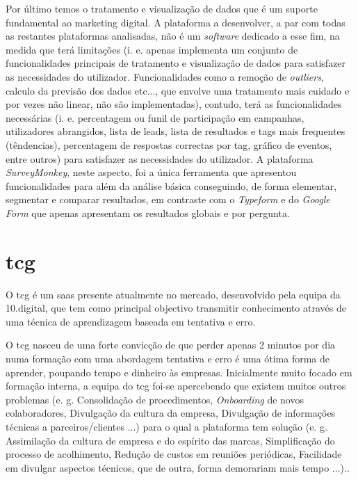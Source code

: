 Por último temos o tratamento e visualização de dados que é um suporte fundamental ao marketing digital. A plataforma a desenvolver, a par com todas as restantes plataformas analisadas, não é um \textit{software} dedicado a esse fim, na medida que terá limitações (i. e. apenas implementa um conjunto de funcionalidades principais de tratamento e visualização de dados para satisfazer as necessidades do utilizador. Funcionalidades como a remoção de \textit{outliers}, calculo da previsão dos dados etc..., que envolve uma tratamento mais cuidado e por vezes não linear, não são implementadas), contudo, terá as funcionalidades necessárias (i. e. percentagem ou funil de participação em campanhas, utilizadores abrangidos, lista de leads, lista de resultados e tags mais frequentes (têndencias), percentagem de respostas correctas por tag, gráfico de eventos, entre outros) para satisfazer as necessidades do utilizador. A plataforma \textit{SurveyMonkey}, neste aspecto, foi a única ferramenta que apresentou funcionalidades para além da análise básica conseguindo, de forma elementar, segmentar e comparar resultados, em contraste com o \textit{Typeform} e do \textit{Google Form} que apenas apresentam os resultados globais e por pergunta.

\section{\acrfull{tcg}}
\label{sec:TCGM}

O \acrlong{tcg} é um \acrshort{saas} presente atualmente no mercado, desenvolvido pela equipa da 10.digital, que tem como principal objectivo transmitir conhecimento através de uma técnica de aprendizagem baseada em tentativa e erro.


 O \acrshort{tcg} nasceu de uma forte convicção de que perder apenas 2 minutos por dia numa formação com uma abordagem tentativa e erro é uma ótima forma de aprender, poupando tempo e dinheiro às empresas. Inicialmente muito focado em formação interna, a equipa do \acrshort{tcg} foi-se apercebendo que existem muitos outros problemas (e. g. Consolidação de procedimentos, \textit{Onboarding} de novos colaboradores, Divulgação da cultura da empresa, Divulgação de informações técnicas a parceiros/clientes ...) para o qual a plataforma tem solução (e. g. Assimilação da cultura de empresa e do espírito das marcas, Simplificação do processo de acolhimento, Redução de custos em reuniões periódicas, Facilidade em divulgar aspectos técnicos, que de outra, forma demorariam mais tempo ...).\cite{tcginfo}. 
 
